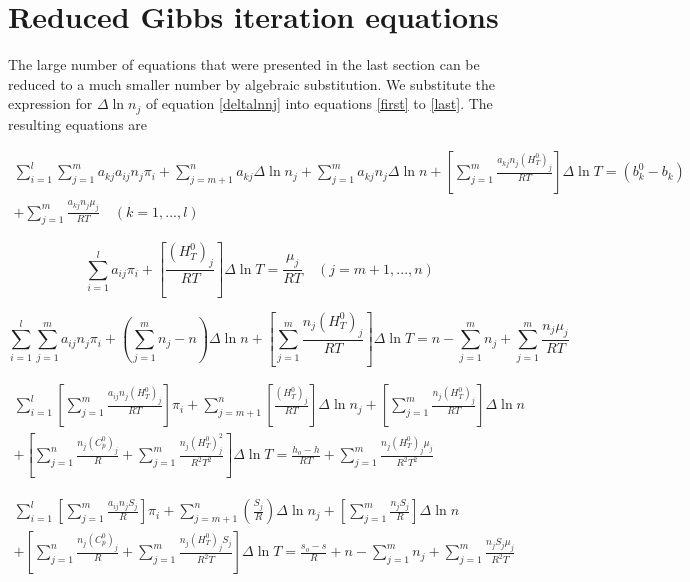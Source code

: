 \documentclass[10pt]{article}
\begin{document}
\section{Reduced Gibbs iteration equations}
The large number of equations that were presented in the last section
can be reduced to a much smaller number by algebraic substitution. We
substitute the expression for $\Delta \ln{n_j}$ of equation
\ref{deltalnnj} into equations \ref{first} to \ref{last}.  The
resulting equations are

\begin{multline}
\sum_{i=1}^{l}\sum_{j=1}^{m}{a_{kj}a_{ij}n_j\pi_i}+\sum_{j=m+1}^{n}{a_{kj}\Delta\ln{n_j}}+\sum_{j=1}^{m}{a_{kj}n_j\Delta\ln{n}}+\left[\sum_{j=1}^{m}{\frac{a_{kj}n_j(H_T^0)_j}{RT}}\right]\Delta\ln{T} = (b_k^0 - b_k) \\
+ \sum_{j=1}^{m}{ \frac{a_{kj}n_j\mu_j}{RT}} \quad (k = 1,...,l)
\end{multline}

\begin{equation}
\sum_{i=1}^{l}{a_{ij}\pi_i} + \left[
\frac{(H_T^0)_j}{RT}\right]\Delta \ln{T} = \frac{\mu_j}{RT} \quad
(j=m+1,...,n)
\end{equation}

\begin{equation}
\sum_{i=1}^{l}\sum_{j=1}^{m}{a_{ij}n_j\pi_i}+\left(
\sum_{j=1}^{m}{n_j}-n\right)\Delta \ln{n} + \left[ \sum_{j=1}^{m}{
\frac{n_j(H_T^0)_j}{RT}}\right]\Delta \ln{T} = n -
\sum_{j=1}^{m}{n_j}+\sum_{j=1}^{m}{\frac{n_j\mu_j}{RT}}
\end{equation}


\begin{multline}
\sum_{i=1}^{l} \left[
\sum_{j=1}^{m}{\frac{a_{ij}n_j(H_T^0)_j}{RT}}
\right]\pi_i
+\sum_{j=m+1}^{n}{ \left[\frac{(H_T^0)_j}{RT} \right] }\Delta \ln{n_j}+
\left[ \sum_{j=1}^{m}{\frac{n_j(H_T^0)_j}{RT}} \right] \Delta \ln{n} \\
+\left[ \sum_{j=1}^{n}{\frac{n_j(C_p^0)_j}{R}} + \sum_{j=1}^{m}{
\frac{n_j(H_T^0)_j^2}{R^2T^2}} \right] \Delta \ln{T} = \frac{h_o-h}{RT} + \sum_{j=1}^{m}{\frac{n_j(H_T^0)_j\mu_j}{R^2T^2}}
\end{multline}

\begin{multline}
\sum_{i=1}^{l} \left[
\sum_{j=1}^{m}{\frac{a_{ij}n_jS_j}{R}}
\right]\pi_i
+\sum_{j=m+1}^{n}{ \left(\frac{S_j}{R} \right) }\Delta \ln{n_j}+
\left[ \sum_{j=1}^{m}{\frac{n_jS_j}{R}} \right] \Delta \ln{n} \\
+\left[ \sum_{j=1}^{n}{\frac{n_j(C_p^0)_j}{R}} + \sum_{j=1}^{m}{
\frac{n_j(H_T^0)_jS_j}{R^2T}} \right] \Delta \ln{T} = \frac{s_o-s}{R} 
+ n - \sum_{j=1}^{m}{n_j} +  \sum_{j=1}^{m}{\frac{n_jS_j\mu_j}{R^2T}}
\end{multline}
\end{document}

